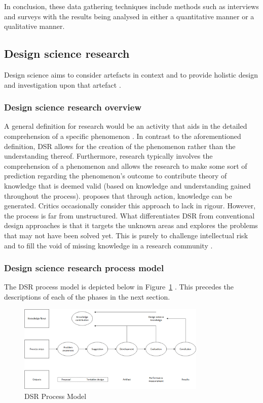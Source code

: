 In conclusion, these data gathering techniques include methods such as interviews and surveys with the results being analysed in either a quantitative manner or a qualitative manner.

\subsection{Design science research}
Design science aims to consider artefacts in context and to provide holistic design and investigation upon that artefact \citep{wieringa2014design}.

\subsubsection{Design science research overview}
A general definition for research would be an activity that aids in the detailed comprehension of a specific phenomenon \citep{Vaishnavi2015}. In contrast to the aforementioned definition, DSR allows for the creation of the phenomenon rather than the understanding thereof. Furthermore, research typically involves the comprehension of a phenomenon and allows the research to make some sort of prediction regarding the phenomenon’s outcome to contribute theory of knowledge that is deemed valid (based on knowledge and understanding gained throughout the process). \cite{owen1998design} proposes that through action, knowledge can be generated. Critics occasionally consider this approach to lack in rigour. However, the process is far from unstructured.
What differentiates DSR from conventional design approaches is that it targets the unknown areas and explores the problems that may not have been solved yet. This is purely to challenge intellectual risk and to fill the void of missing knowledge in a research community \citep{Vaishnavi2015}.


\subsubsection{Design science research process model}
The DSR process model is depicted below in Figure~\ref{fig:DSR_Process_Model} \citep{Vaishnavi2015}. This precedes the descriptions of each of the phases in the next section.
\begin{figure}[ht]
\centering
\includegraphics[width=0.8\textwidth]{Chapter1/Figs/Figure1-2.png}
% 
\caption{DSR Process Model}
\label{fig:DSR_Process_Model}
\end{figure}

